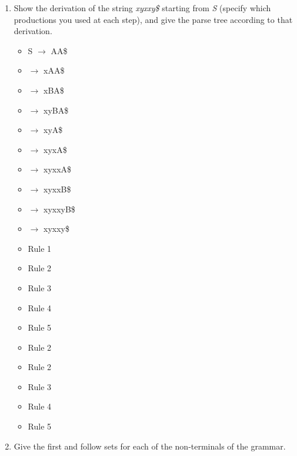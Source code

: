 \documentclass{article}
\begin{document}
\begin{enumerate}
\begin{enumerate}
    \item Show the derivation of the string \textit{xyxxy\$} starting from \textit{S} (specify which productions you used at each step), and give the parse tree according to that derivation.
\begin{multicols}{2}
  \begin{itemize}
    \setlength\itemsep{-.25em}
    \item[] S $\rightarrow$ AA\$
    \item[] \hspace{.9em}$\rightarrow$ xAA\$
    \item[] \hspace{.9em}$\rightarrow$ xBA\$
    \item[] \hspace{.9em}$\rightarrow$ xyBA\$
    \item[] \hspace{.9em}$\rightarrow$ xyA\$
    \item[] \hspace{.9em}$\rightarrow$ xyxA\$
    \item[] \hspace{.9em}$\rightarrow$ xyxxA\$
    \item[] \hspace{.9em}$\rightarrow$ xyxxB\$
    \item[] \hspace{.9em}$\rightarrow$ xyxxyB\$
    \item[] \hspace{.9em}$\rightarrow$ xyxxy\$
  \end{itemize}
  \begin{itemize}
    \setlength\itemsep{-.25em}
    \item[] Rule 1
    \item[] Rule 2
    \item[] Rule 3
    \item[] Rule 4
    \item[] Rule 5
    \item[] Rule 2
    \item[] Rule 2
    \item[] Rule 3
    \item[] Rule 4
    \item[] Rule 5
  \end{itemize}
\end{multicols}
    
    \item Give the first and follow sets for each of the non-terminals of the grammar.\newline
    

\end{enumerate}
\end{enumerate}
\end{document}
